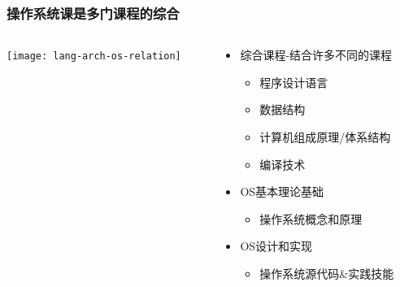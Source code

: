 \begin{frame}
    \frametitle{操作系统课是多门课程的综合}
    
        \begin{columns}
    	
    	
    	\begin{column}{0.4\textwidth}	
    		\texttt{[image: lang-arch-os-relation]}	
    	\end{column}
    	
    	\begin{column}{0.5\textwidth}
    		
    \begin{itemize}

        \item 综合课程-结合许多不同的课程
        \begin{itemize}
            \item 程序设计语言
            \item 数据结构
            \item 计算机组成原理/体系结构
            \item 编译技术
        \end{itemize} \pause
        \item OS基本理论基础
    	\begin{itemize}
    		\item 操作系统概念和原理
    	\end{itemize} \pause
        \item OS设计和实现
        \begin{itemize}
            \item 操作系统源代码\&实践技能
        \end{itemize}
    \end{itemize}

     \end{column}
\end{columns}

\end{frame}
    

